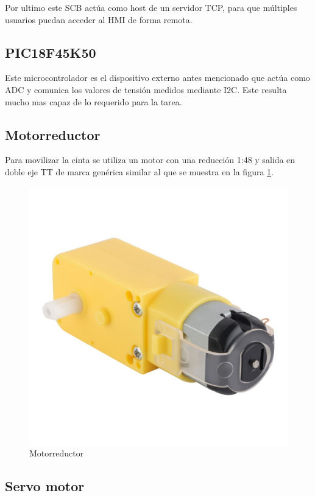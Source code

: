 \documentclass[12pt,letterpaper]{article}     %
\begin{document}
Por ultimo este SCB actúa como host de un servidor TCP, para que múltiples usuarios puedan acceder
al HMI de forma remota.

\subsection{PIC18F45K50}

Este microcontrolador es el dispositivo externo antes mencionado que actúa como ADC y comunica los
valores de tensión medidos mediante I2C. Este resulta mucho mas capaz de lo requerido para la tarea.

\subsection{Motorreductor}

Para movilizar la cinta se utiliza un motor con una reducción 1:48 y salida en doble eje TT de marca
genérica similar al que se muestra en la figura \ref{fig:motor}.

\begin{figure}[!ht]
\centering
\includegraphics[scale=0.25]{imagenes/motorreductor.jpg}
\caption{Motorreductor}
\label{fig:motor}
\end{figure}

\subsection{Servo motor}
\end{document}
